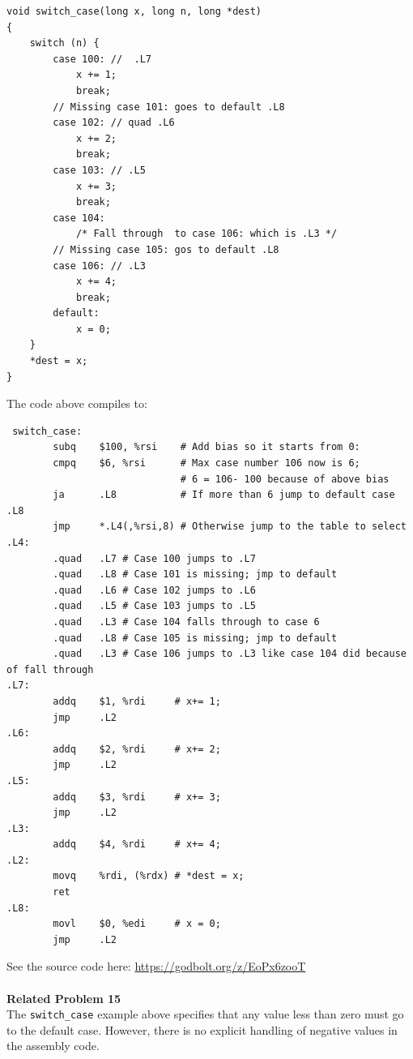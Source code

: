 \documentclass{article}
\begin{document}
\begin{verbatim}
void switch_case(long x, long n, long *dest)
{
    switch (n) {
        case 100: //  .L7
            x += 1;
            break;
        // Missing case 101: goes to default .L8
        case 102: // quad .L6
            x += 2;
            break;
        case 103: // .L5
            x += 3;
            break;
        case 104:
            /* Fall through  to case 106: which is .L3 */
        // Missing case 105: gos to default .L8
        case 106: // .L3
            x += 4;
            break;
        default:
            x = 0;
    }
    *dest = x;
}
\end{verbatim}
The code above compiles to:
\begin{verbatim}
 switch_case:
        subq    $100, %rsi    # Add bias so it starts from 0: 
        cmpq    $6, %rsi      # Max case number 106 now is 6;
                              # 6 = 106- 100 because of above bias
        ja      .L8           # If more than 6 jump to default case .L8
        jmp     *.L4(,%rsi,8) # Otherwise jump to the table to select
.L4:
        .quad   .L7 # Case 100 jumps to .L7
        .quad   .L8 # Case 101 is missing; jmp to default
        .quad   .L6 # Case 102 jumps to .L6
        .quad   .L5 # Case 103 jumps to .L5
        .quad   .L3 # Case 104 falls through to case 6
        .quad   .L8 # Case 105 is missing; jmp to default
        .quad   .L3 # Case 106 jumps to .L3 like case 104 did because of fall through
.L7:
        addq    $1, %rdi     # x+= 1;
        jmp     .L2
.L6:
        addq    $2, %rdi     # x+= 2;
        jmp     .L2
.L5:
        addq    $3, %rdi     # x+= 3;
        jmp     .L2
.L3:
        addq    $4, %rdi     # x+= 4;
.L2:
        movq    %rdi, (%rdx) # *dest = x;
        ret
.L8:
        movl    $0, %edi     # x = 0;
        jmp     .L2
\end{verbatim}

See the source code here: \url{https://godbolt.org/z/EoPx6zooT} \\
\\
\clearpage
\noindent\textbf{Related Problem 15} \\
The \texttt{switch\_case} example above specifies that any value less than zero must go to the default case. However, there is no explicit handling of negative values in the assembly code. 
\end{document}
